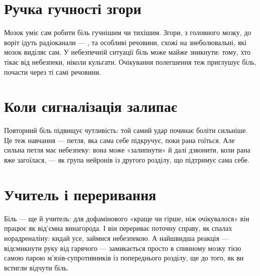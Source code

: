 \section*{Ручка гучності згори}

Мозок уміє сам робити біль гучнішим чи тихішим. Згори, з головного мозку, до воріт ідуть радіоканали --- ,  та особливі речовини, схожі на знеболювальні, які мозок виділяє сам. У небезпечній ситуації біль може майже зникнути: тому, хто тікає від небезпеки, ніколи кульгати. Очікування полегшення теж приглушує біль, почасти через ті самі речовини.

\section*{Коли сигналізація залипає}

Повторний біль підвищує чутливість: той самий удар починає боліти сильніше. Це теж навчання --- петля, яка сама себе підкручує, поки рана гоїться. Але сильна петля має небезпеку: вона може «залипнути» й далі дзвонити, коли рана вже загоїлася, --- як група нейронів із другого розділу, що підтримує сама себе.

\section*{Учитель і переривання}

Біль --- ще й учитель: для дофамінового «краще чи гірше, ніж очікувалося» він працює як від'ємна винагорода. І він перериває поточну справу, як спалах норадреналіну: кидай усе, займися небезпекою. А найшвидша реакція --- відсмикнути руку від гарячого --- замикається просто в спинному мозку тією самою парою м'язів-супротивників із попереднього розділу, ще до того, як ви встигли відчути біль.

